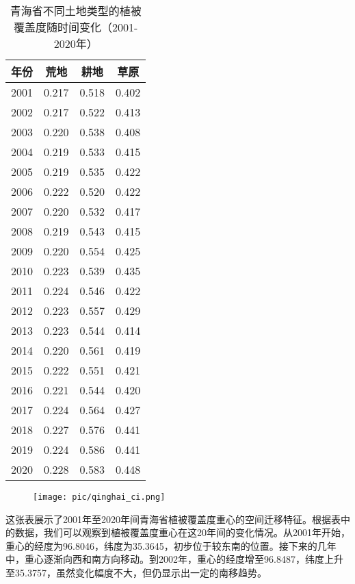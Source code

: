 \documentclass{article}
\begin{document}
		\begin{table}[H]
			\centering
			\begin{tabular}{|c|c|c|c|}
				\hline
				\textbf{年份} & \textbf{荒地} & \textbf{耕地} & \textbf{草原} \\
				\hline
				2001 & 0.217 & 0.518 & 0.402 \\
				2002 & 0.217 & 0.522 & 0.413 \\
				2003 & 0.220 & 0.538 & 0.408 \\
				2004 & 0.219 & 0.533 & 0.415 \\
				2005 & 0.219 & 0.535 & 0.422 \\
				2006 & 0.222 & 0.520 & 0.422 \\
				2007 & 0.220 & 0.532 & 0.417 \\
				2008 & 0.219 & 0.543 & 0.415 \\
				2009 & 0.220 & 0.554 & 0.425 \\
				2010 & 0.223 & 0.539 & 0.435 \\
				2011 & 0.224 & 0.546 & 0.422 \\
				2012 & 0.223 & 0.557 & 0.429 \\
				2013 & 0.223 & 0.544 & 0.414 \\
				2014 & 0.220 & 0.561 & 0.419 \\
				2015 & 0.222 & 0.551 & 0.421 \\
				2016 & 0.221 & 0.544 & 0.420 \\
				2017 & 0.224 & 0.564 & 0.427 \\
				2018 & 0.227 & 0.576 & 0.441 \\
				2019 & 0.224 & 0.586 & 0.441 \\
				2020 & 0.228 & 0.583 & 0.448 \\
				\hline
			\end{tabular}
			\caption{青海省不同土地类型的植被覆盖度随时间变化（2001-2020年）}
		\end{table}
		
		\begin{figure}[H]  %
			\centering
			\texttt{[image: pic/qinghai\_ci.png]} %
		\end{figure}
		
		这张表展示了2001年至2020年间青海省植被覆盖度重心的空间迁移特征。根据表中的数据，我们可以观察到植被覆盖度重心在这20年间的变化情况。从2001年开始，重心的经度为96.8046，纬度为35.3645，初步位于较东南的位置。接下来的几年中，重心逐渐向西和南方向移动。到2002年，重心的经度增至96.8487，纬度上升至35.3757，虽然变化幅度不大，但仍显示出一定的南移趋势。
		
\end{document}

